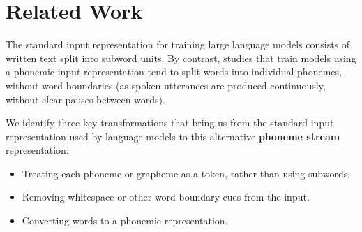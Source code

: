 \section{Related Work}


The standard input representation for training large language models consists of written text split into subword units. By contrast, studies that train models using a phonemic input representation tend to split words into individual phonemes, without word boundaries (as spoken utterances are produced continuously, without clear pauses between words).

We identify three key transformations that bring us from the standard input representation used by language models to this alternative \textbf{phoneme stream} representation:


\begin{itemize}
\setlength\itemsep{0.1em}
    \item {} Treating each phoneme or grapheme as a token, rather than using subwords.
    \item {} Removing whitespace or other word boundary cues from the input.
    \item {} Converting words to a phonemic representation. 
\end{itemize}


